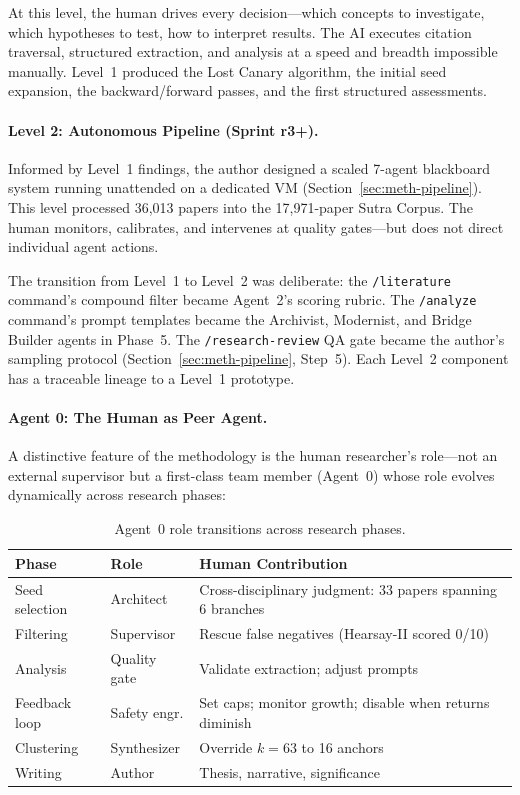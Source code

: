 \documentclass{article}
\begin{document}
\noindent
At this level, the human drives every decision---which concepts to investigate, which
hypotheses to test, how to interpret results. The AI executes citation traversal,
structured extraction, and analysis at a speed and breadth impossible manually.
Level~1 produced the Lost Canary algorithm, the initial seed expansion, the
backward/forward passes, and the first structured assessments.

\paragraph{Level 2: Autonomous Pipeline (Sprint r3+).}
Informed by Level~1 findings, the author designed a scaled 7-agent blackboard system
running unattended on a dedicated VM (Section~\ref{sec:meth-pipeline}). This level
processed 36,013 papers into the 17,971-paper Sutra Corpus. The human
monitors, calibrates, and intervenes at quality gates---but does not direct individual
agent actions.

The transition from Level~1 to Level~2 was deliberate: the \texttt{/literature}
command's compound filter became Agent~2's scoring rubric. The \texttt{/analyze}
command's prompt templates became the Archivist, Modernist, and Bridge Builder agents
in Phase~5. The \texttt{/research-review} QA gate became the author's sampling protocol
(Section~\ref{sec:meth-pipeline}, Step~5). Each Level~2 component has a traceable
lineage to a Level~1 prototype.

\paragraph{Agent 0: The Human as Peer Agent.}
A distinctive feature of the methodology is the human researcher's role---not an
external supervisor but a first-class team member (Agent~0) whose role evolves
dynamically across research phases:

\begin{table}[h]
\centering
\caption{Agent~0 role transitions across research phases.}
\label{tab:agent0-roles}
\small
\begin{tabular}{@{} l l p{3.5cm} @{}}
\toprule
\textbf{Phase} & \textbf{Role} & \textbf{Human Contribution} \\
\midrule
Seed selection & Architect & Cross-disciplinary judgment: 33 papers spanning 6 branches \\
Filtering & Supervisor & Rescue false negatives (Hearsay-II scored 0/10) \\
Analysis & Quality gate & Validate extraction; adjust prompts \\
Feedback loop & Safety engr. & Set caps; monitor growth; disable when returns diminish \\
Clustering & Synthesizer & Override $k{=}63$ to 16 anchors \\
Writing & Author & Thesis, narrative, significance \\
\bottomrule
\end{tabular}
\end{table}
\end{document}
